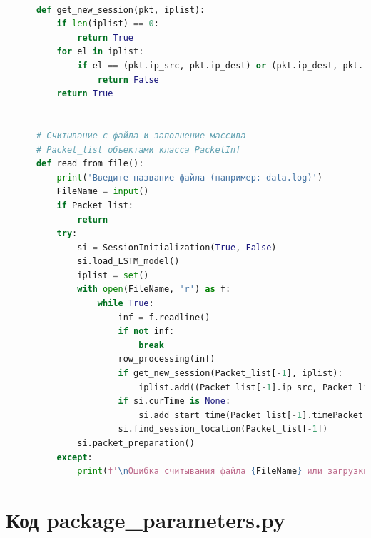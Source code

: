 \documentclass[bachelor, och, coursework]{SCWorks}
\begin{document}
\begin{lstlisting}[language=Python]
      
      def get_new_session(pkt, iplist):
          if len(iplist) == 0:
              return True
          for el in iplist:
              if el == (pkt.ip_src, pkt.ip_dest) or (pkt.ip_dest, pkt.ip_src) == el:
                  return False
          return True
      
      
      # Считывание с файла и заполнение массива
      # Packet_list объектами класса PacketInf
      def read_from_file():
          print('Введите название файла (например: data.log)')
          FileName = input()
          if Packet_list:
              return
          try:
              si = SessionInitialization(True, False)
              si.load_LSTM_model()
              iplist = set()
              with open(FileName, 'r') as f:
                  while True:
                      inf = f.readline()
                      if not inf:
                          break
                      row_processing(inf)
                      if get_new_session(Packet_list[-1], iplist):
                          iplist.add((Packet_list[-1].ip_src, Packet_list[-1].ip_dest))
                      if si.curTime is None:
                          si.add_start_time(Packet_list[-1].timePacket) 
                      si.find_session_location(Packet_list[-1])
              si.packet_preparation()
          except:
              print(f'\nОшибка считывания файла {FileName} или загрузки модели model.keras!\n')
    \end{lstlisting}

    \section{Код package\_parameters.py}
\end{document}
